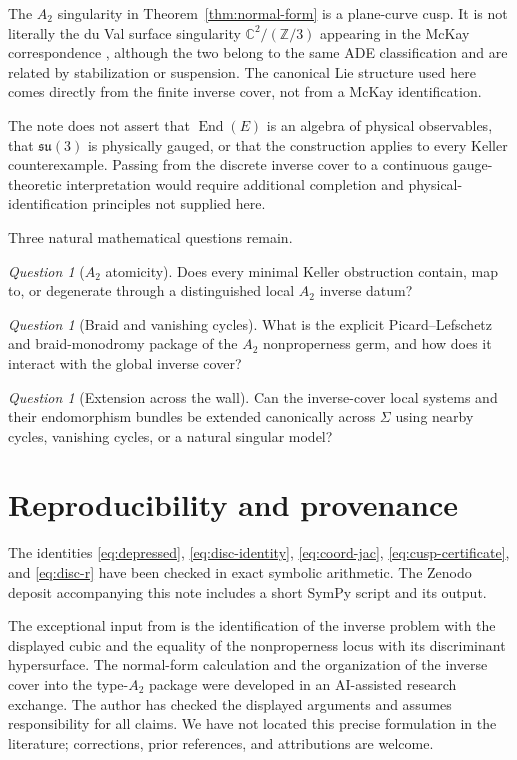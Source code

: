 \documentclass[11pt,reqno]{amsart}
\numberwithin{equation}{section}
\theoremstyle{remark}
\newtheorem{question}[theorem]{Question}
\newcommand{\C}{\mathbb C}
\newcommand{\End}{\operatorname{End}}
\begin{document}
The $A_2$ singularity in Theorem~\ref{thm:normal-form} is a plane-curve cusp. It is not literally the du Val surface singularity $\C^2/(\mathbb Z/3)$ appearing in the McKay correspondence \cite{McKay1980}, although the two belong to the same ADE classification and are related by stabilization or suspension. The canonical Lie structure used here comes directly from the finite inverse cover, not from a McKay identification.

The note does not assert that $\End(E)$ is an algebra of physical observables, that $\mathfrak{su}(3)$ is physically gauged, or that the construction applies to every Keller counterexample. Passing from the discrete inverse cover to a continuous gauge-theoretic interpretation would require additional completion and physical-identification principles not supplied here.

Three natural mathematical questions remain.

\begin{question}[$A_2$ atomicity]
Does every minimal Keller obstruction contain, map to, or degenerate through a distinguished local $A_2$ inverse datum?
\end{question}

\begin{question}[Braid and vanishing cycles]
What is the explicit Picard--Lefschetz and braid-monodromy package of the $A_2$ nonproperness germ, and how does it interact with the global inverse cover?
\end{question}

\begin{question}[Extension across the wall]
Can the inverse-cover local systems and their endomorphism bundles be extended canonically across $\Sigma$ using nearby cycles, vanishing cycles, or a natural singular model?
\end{question}

\section{Reproducibility and provenance}

The identities \eqref{eq:depressed}, \eqref{eq:disc-identity}, \eqref{eq:coord-jac}, \eqref{eq:cusp-certificate}, and \eqref{eq:disc-r} have been checked in exact symbolic arithmetic. The Zenodo deposit accompanying this note includes a short SymPy script and its output.

The exceptional input from \cite{Counterexample2026} is the identification of the inverse problem with the displayed cubic and the equality of the nonproperness locus with its discriminant hypersurface. The normal-form calculation and the organization of the inverse cover into the type-$A_2$ package were developed in an AI-assisted research exchange. The author has checked the displayed arguments and assumes responsibility for all claims. We have not located this precise formulation in the literature; corrections, prior references, and attributions are welcome.
\end{document}
